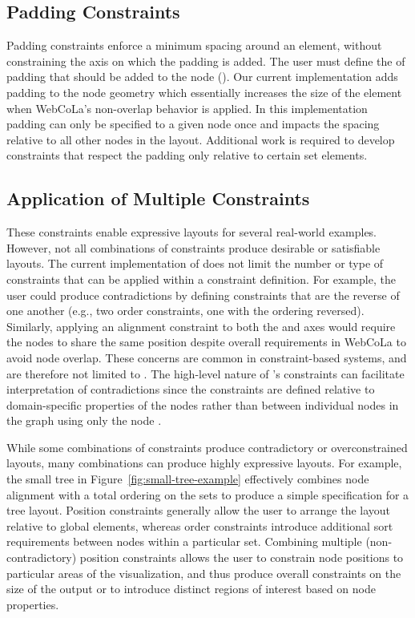 \subsection{Padding Constraints}
Padding constraints enforce a minimum spacing around an element, without 
constraining the axis on which the padding is added. The user must define 
the  of padding that should be added to the node 
().
Our current implementation adds padding to the node geometry which 
essentially increases the size of the element
when WebCoLa's non-overlap behavior is applied. In this implementation
padding can only be specified to a given node once and impacts the spacing
relative to all other nodes in the layout.
Additional work is required to develop constraints that
respect the padding only relative to certain set elements.

\vspace{-10px}
\subsection{Application of Multiple Constraints}
\syphilisLayout
\syphilisSpec
These constraints enable expressive layouts for several real-world examples. However, not 
all combinations of constraints produce desirable or satisfiable layouts.
The current implementation of \projectname does not limit the number or
type of constraints that can be applied within a constraint definition.
For example, the user could produce contradictions by defining constraints
that are the reverse of one another (e.g., two order constraints, one with the
ordering reversed). Similarly, applying an alignment constraint to both the 
and  axes would require the nodes to share the same position despite
overall requirements in WebCoLa to avoid node overlap. These concerns are common in
constraint-based systems, and are therefore not limited to \projectname.
The high-level nature of \projectname's constraints can facilitate
interpretation of contradictions since the constraints are defined
relative to domain-specific properties of the nodes rather than between
individual nodes in the graph using only the node .

While some combinations of constraints produce contradictory or overconstrained layouts,
many combinations can produce highly expressive layouts.
For example, the small tree in Figure~\ref{fig:small-tree-example}
effectively combines node alignment with a total ordering on the sets 
to produce a simple specification for a tree layout. Position constraints
generally allow the user to arrange the layout relative to global elements,
whereas order constraints introduce additional sort requirements between nodes
within a particular set. Combining multiple (non-contradictory) position
constraints allows the user to constrain node positions to particular
areas of the visualization, and thus produce overall constraints on the size of the
output or to introduce distinct regions of interest based on node properties.
